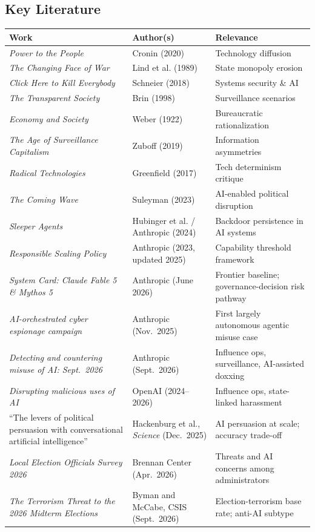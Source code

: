 \documentclass[11pt,letterpaper]{article}
\renewcommand{\arraystretch}{1.4}
\begin{document}
\subsection{Key Literature}

{\footnotesize\renewcommand{\arraystretch}{1.15}
\begin{longtable}{L{5.8cm}L{4.0cm}L{5.4cm}}
\toprule
\textbf{Work} & \textbf{Author(s)} & \textbf{Relevance} \\
\midrule
\endhead
\bottomrule
\endlastfoot
\textit{Power to the People} & Cronin (2020) & Technology diffusion \\
\textit{The Changing Face of War} & Lind et al. (1989) & State monopoly erosion \\
\textit{Click Here to Kill Everybody} & Schneier (2018) & Systems security \& AI \\
\textit{The Transparent Society} & Brin (1998) & Surveillance scenarios \\
\textit{Economy and Society} & Weber (1922) & Bureaucratic rationalization \\
\textit{The Age of Surveillance Capitalism} & Zuboff (2019) & Information asymmetries \\
\textit{Radical Technologies} & Greenfield (2017) & Tech determinism critique \\
\textit{The Coming Wave} & Suleyman (2023) & AI-enabled political disruption \\
\textit{Sleeper Agents} & Hubinger et al. / Anthropic (2024) & Backdoor persistence in AI systems \\
\textit{Responsible Scaling Policy} & Anthropic (2023, updated 2025) & Capability threshold framework \\
\textit{System Card: Claude Fable 5 \& Mythos 5} & Anthropic (June 2026) & Frontier baseline; governance-decision risk pathway \\
\textit{AI-orchestrated cyber espionage campaign} & Anthropic (Nov.\ 2025) & First largely autonomous agentic misuse case \\
\textit{Detecting and countering misuse of AI: Sept.\ 2026} & Anthropic (Sept.\ 2026) & Influence ops, surveillance, AI-assisted doxxing \\
\textit{Disrupting malicious uses of AI} & OpenAI (2024--2026) & Influence ops, state-linked harassment \\
``The levers of political persuasion with conversational artificial intelligence'' & Hackenburg et al., \textit{Science} (Dec.\ 2025) & AI persuasion at scale; accuracy trade-off \\
\textit{Local Election Officials Survey 2026} & Brennan Center (Apr.\ 2026) & Threats and AI concerns among administrators \\
\textit{The Terrorism Threat to the 2026 Midterm Elections} & Byman and McCabe, CSIS (Sept.\ 2026) & Election-terrorism base rate; anti-AI subtype \\
\end{longtable}}
\end{document}

